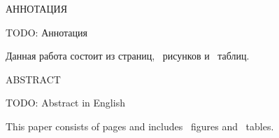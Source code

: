 \begin{center}
	АННОТАЦИЯ
\end{center}

TODO: Аннотация

Данная работа состоит из \pageref{LastPage} страниц, \totalfigures ~рисунков и
\totaltables ~таблиц.

\begin{center}
	ABSTRACT
\end{center}

TODO: Abstract in English

This paper consists of \pageref{LastPage} pages and includes \totalfigures ~figures and
\totaltables ~tables.
